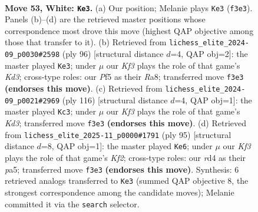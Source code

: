 \documentclass[11pt]{article}
\begin{document}
\clearpage

\begin{figure}[p]\centering
\begin{subfigure}{0.46\textwidth}\centering
\resizebox{\linewidth}{!}{%
\newchessgame
\chessboard[
  setfen={8/p2p2k1/2p5/5P2/3r4/5K2/8/8 w - - 7 53},
  showmover=false,
  pgfstyle=straightmove, color=movearrow, markmove={f3-e3}
]}
\caption{}
\end{subfigure}\hfill
\begin{subfigure}{0.46\textwidth}\centering
\resizebox{\linewidth}{!}{%
\newchessgame
\chessboard[
  setfen={R7/2k2p1p/4p3/8/8/3K4/5r2/8 w - - 1 49},
  showmover=false,
  pgfstyle=straightmove, color=movearrow, markmove={d3-e3}
]}
\caption{}
\end{subfigure}
\\[4pt]
\begin{subfigure}{0.46\textwidth}\centering
\resizebox{\linewidth}{!}{%
\newchessgame
\chessboard[
  setfen={8/pp6/2p5/8/6k1/3K4/r7/8 w - - 0 59},
  showmover=false,
  pgfstyle=straightmove, color=movearrow, markmove={d3-c3}
]}
\caption{}
\end{subfigure}\hfill
\begin{subfigure}{0.46\textwidth}\centering
\resizebox{\linewidth}{!}{%
\newchessgame
\chessboard[
  setfen={8/5k2/8/Pp6/5P2/6P1/P5K1/8 b - - 0 48},
  showmover=false,
  pgfstyle=straightmove, color=movearrow, markmove={f7-e6}
]}
\caption{}
\end{subfigure}
\caption{\textbf{Move 53, White: \texttt{Ke3}.} (a) Our position; Melanie plays \texttt{Ke3} (\texttt{f3e3}). Panels (b)--(d) are the retrieved master positions whose correspondence most drove this move (highest QAP objective among those that transfer to it). (b) Retrieved from \texttt{lichess\_elite\_2024-09\_p0030\#2598} (ply 96) [structural distance $d$=4, QAP obj=2]: the master played \texttt{Ke3}; under $\mu$ our \emph{Kf3} plays the role of that game's \emph{Kd3}; cross-type roles: our \emph{P}f5 as their \emph{R}a8; transferred move \texttt{f3e3} \textbf{(endorses this move)}. (c) Retrieved from \texttt{lichess\_elite\_2024-09\_p0021\#2969} (ply 116) [structural distance $d$=4, QAP obj=1]: the master played \texttt{Kc3}; under $\mu$ our \emph{Kf3} plays the role of that game's \emph{Kd3}; transferred move \texttt{f3e3} \textbf{(endorses this move)}. (d) Retrieved from \texttt{lichess\_elite\_2025-11\_p0000\#1791} (ply 95) [structural distance $d$=8, QAP obj=1]: the master played \texttt{Ke6}; under $\mu$ our \emph{Kf3} plays the role of that game's \emph{Kf2}; cross-type roles: our \emph{r}d4 as their \emph{p}a5; transferred move \texttt{f3e3} \textbf{(endorses this move)}. Synthesis: 6 retrieved analogs transferred to \texttt{Ke3} (summed QAP objective 8, the strongest correspondence among the candidate moves); Melanie committed it via the \texttt{search} selector.}
\label{fig:thought-m104}
\end{figure}
\end{document}
